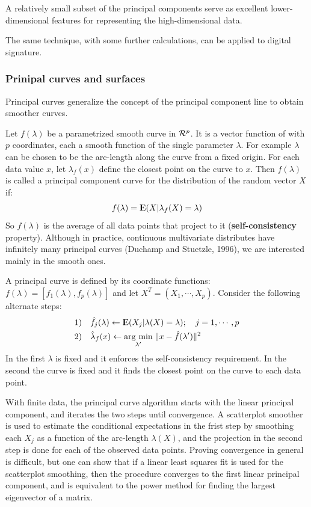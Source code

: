 \documentclass[12pt, letterpaper]{article}
\theoremstyle{definition}
\newcommand{\E}{{\rm I\kern-.3em E}}
\DeclarePairedDelimiter\autobracket{(}{)}
\newcommand{\br}[1]{\autobracket*{#1}}
\newcommand{\argmin}[1]{\underset{#1}{\operatorname{arg}\,\operatorname{min}}\;}
\begin{document}
A relatively small subset of the principal components serve as excellent lower-dimensional features for representing the high-dimensional data.

The same technique, with some further calculations, can be applied to digital signature.

\subsubsection{Prinipal curves and surfaces}
Principal curves generalize the concept of the principal component line to obtain smoother curves. 

Let $f(\lambda)$ be a parametrized smooth curve in $\CMcal{R}^p$. It is a vector function of with $p$ coordinates, each a smooth function of the single parameter $\lambda$. For example $\lambda$ can be chosen to be the arc-length along the curve from a fixed origin. For each data value $x$, let $\lambda_f(x)$ define the closest point on the curve to $x$. Then $f(\lambda)$ is called a principal component curve for the distribution of the random vector $X$ if:
\begin{equation}
f(\lambda) = \E\br{X|\lambda_f(X) = \lambda}
\end{equation}
So $f(\lambda)$ is the average of all data points that project to it (\textbf{self-consistency} property). Although in practice, continuous multivariate distributes have infinitely many principal curves (Duchamp and Stuetzle, 1996), we are interested mainly in the smooth ones.

A principal curve is defined by its coordinate functions: $f(\lambda) = [ f_1(\lambda), f_p(\lambda)]$ and let $X^T = (X_1, \cdots, X_p)$. Consider the following alternate steps:
\begin{equation}
\begin{aligned}
&1) \quad \hat{f}_j(\lambda)\leftarrow \E \br{X_j|\lambda(X) = \lambda}; \quad j=1,\cdots, p\\
&2) \quad \hat{\lambda}_f(x) \leftarrow \argmin{\lambda'}{\|x -\hat{f}(\lambda')\|^2}
\end{aligned}
\end{equation}
In the first $\lambda$ is fixed and it enforces the self-consistency requirement. In the second the curve is fixed and it finds the closest point on the curve to each data point.

With finite data, the principal curve algorithm starts with the linear principal component, and iterates the two steps until convergence.
A scatterplot smoother is used to estimate the conditional expectations in the frist step by smoothing each $X_j$ as a function of the arc-length $\lambda(X)$, and the projection in the second step is done for each of the observed data points. Proving convergence in general is difficult, but one can show that if a linear least squares fit is used for the scatterplot smoothing, then the procedure converges to the first linear principal component, and is equivalent to the power method for finding the largest eigenvector of a matrix.
\end{document}
